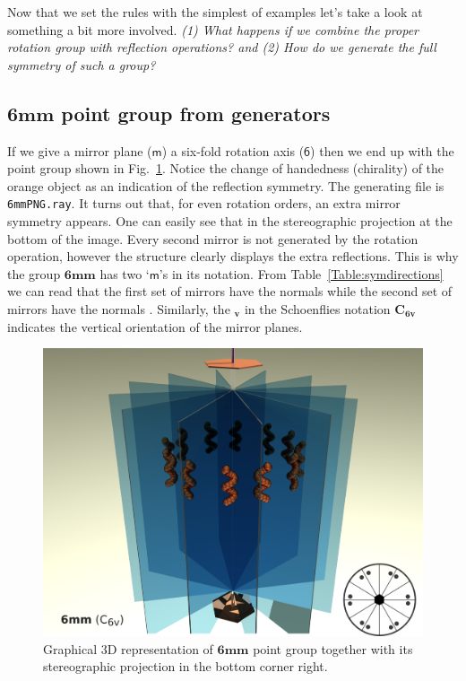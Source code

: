 Now that we set the rules with the simplest of examples let's take a look at something a bit more involved. \textit{(1) What happens if we combine the proper rotation group with reflection operations? and (2) How do we generate the full symmetry of such a group?} 

\subsection{\texorpdfstring{$\mathbf{6mm}$}{6mm} point group from generators}
\label{subChap:pointGroup}
If we give a mirror plane ($\mathsf{m}$) a six-fold rotation axis ($\mathsf{6}$) then we end up with the point group shown in Fig.~\ref{Fig:6mm}. Notice the change of handedness (chirality) of the orange object as an indication of the reflection symmetry. The generating file is \texttt{6mmPNG.ray}. It turns out that, for even rotation orders, an extra mirror symmetry appears. One can easily see that in the stereographic projection at the bottom of the image. Every second mirror is not generated by the rotation operation, however the structure clearly displays the extra reflections. This is why the group $\mathbf{6mm}$ has two `$\mathsf{m}$'s in its notation. From Table~\ref{Table:symdirections} we can read that the first set of mirrors have the normals  while the second set of mirrors have the normals . Similarly, the $_\mathbf{v}$ in the Schoenflies notation $\mathbf{C_{6v}}$ indicates the vertical orientation of the mirror planes.  

\begin{figure}[ht]
    \centering
\includegraphics[width=0.85\linewidth]{Figures/pointGroup.png}
\caption[ $\mathbf{6mm}$ point group. ]{ Graphical 3D representation of $\mathbf{6mm}$ point group together with its stereographic projection in the bottom corner right. }
\label{Fig:6mm}
\end{figure}




